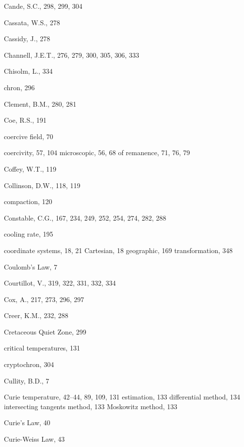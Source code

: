 \documentclass[,plain]{tauxe}
\begin{document}
\begin{theindex}
  \indexspace

  \item Cande, S.C., 298, 299, 304
  \item Cassata, W.S., 278
  \item Cassidy, J., 278
  \item Channell, J.E.T., 276, 279, 300, 305, 306, 333
  \item Chisolm, L., 334
  \item chron, 296
  \item Clement, B.M., 280, 281
  \item Coe, R.S., 191
  \item coercive field, 70
  \item coercivity, 57, 104
    \subitem microscopic, 56, 68
    \subitem of remanence, 71, 76, 79
  \item Coffey, W.T., 119
  \item Collinson, D.W., 118, 119
  \item compaction, 120
  \item Constable, C.G., 167, 234, 249, 252, 254, 274, 282, 288
  \item cooling rate, 195
  \item coordinate systems, 18, 21
    \subitem  Cartesian, 18
    \subitem geographic, 169
    \subitem transformation, 348
  \item Coulomb's Law, 7
  \item Courtillot, V., 319, 322, 331, 332, 334
  \item Cox, A., 217, 273, 296, 297
  \item Creer, K.M., 232, 288
  \item Cretaceous Quiet Zone, 299
  \item critical temperatures, 131
  \item cryptochron, 304
  \item Cullity, B.D., 7
  \item Curie temperature, 42--44, 89, 109, 131
    \subitem estimation, 133
      \subsubitem differential method, 134
      \subsubitem intersecting tangents method, 133
      \subsubitem Moskowitz method, 133
  \item Curie's Law, 40
  \item Curie-Weiss Law, 43

  \indexspace


\end{theindex}
\end{document}
